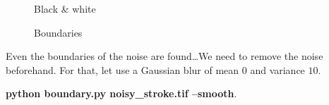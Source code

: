 \begin{figure}[!htb]
\begin{minipage}{0.45\textwidth}
        \caption{\small{Black \& white}}
    \end{minipage}
\end{figure}

\begin{figure}[!htb]\centering
    \begin{minipage}{0.7\textwidth}
        \caption{\small{Boundaries}}
    \end{minipage}
\end{figure}

Even the boundaries of the noise are found\ldots We need to remove the noise beforehand. For that, let use a Gaussian blur of mean $0$ and variance $10$.

\pagebreak

\textbf{python boundary.py noisy\_stroke.tif --smooth}.

